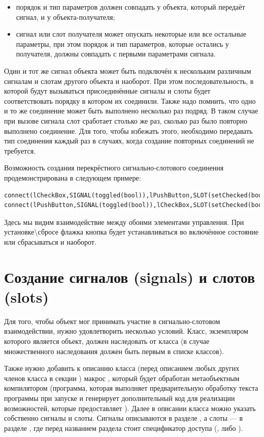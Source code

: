 \begin{itemize}
\item порядок и тип параметров должен совпадать у объекта, который передаёт сигнал, и у объекта-получателя;
\item сигнал или слот получателя может опускать некоторые или все остальные параметры, при этом порядок и тип
параметров, которые остались у получателя, должны совпадать с первыми параметрами сигнала.
\end{itemize}
Один и тот же сигнал объекта может быть подключён к нескольким различным сигналам и слотам другого объекта и наоборот.
При этом последовательность, в которой будут вызываться присоединённые сигналы и слоты будет соответствовать порядку в
котором их соединили. Также надо помнить, что одно и то же соединение может быть выполнено несколько раз подряд. В
таком случае при вызове сигнала слот сработает столько же раз, сколько раз было повторно выполнено соединение. Для того,
чтобы избежать этого, необходимо передавать тип соединения  каждый раз в случаях, когда
создание повторных соединений не требуется.

Возможность создания перекрёстного сигнально-слотового соединения продемонстрирована в следующем примере:
\begin{lstlisting}
connect(lCheckBox,SIGNAL(toggled(bool)),lPushButton,SLOT(setChecked(bool)));
connect(lPushButton,SIGNAL(toggled(bool)),lCheckBox,SLOT(setChecked(bool)));
\end{lstlisting}

Здесь мы видим взаимодействие между обоими элементами управления. При установке{\textbackslash}сбросе флажка кнопка
будет устанавливаться во включённое состояние или сбрасываться и наоборот.

\section[Создание сигналов (signals) и слотов (slots)]{Создание сигналов (signals) и слотов (slots)}
Для того, чтобы объект мог принимать участие в сигнально-слотовом взаимодействии, нужно удовлетворить несколько условий.
Класс, экземпляром которого является объект, должен наследовать от класса  (в случае множественного
наследования  должен быть первым в списке классов). 

Также нужно добавить к описанию класса (перед описанием любых других членов класса в секции ) макрос
, который будет обработан метаобъектным компилятором  (программа, которая выполняет
предварительную обработку текста программы при запуске  и генерирует дополнительный код для реализации
возможностей, которые предоставляет ). Далее в описании класса можно указать собственно сигналы и слоты.
Сигналы описываются в разделе , а слоты ---  в разделе , где перед названием
раздела стоит спецификатор доступа (,  либо ). 

